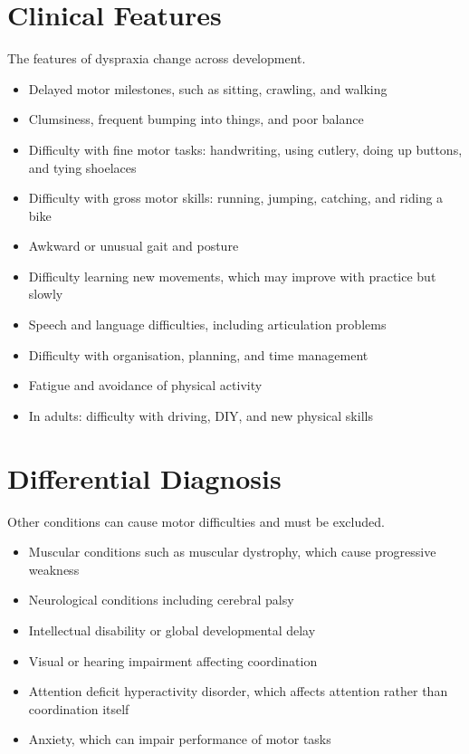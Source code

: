 \section*{Clinical Features}
The features of dyspraxia change across development.
\begin{itemize}
    \item Delayed motor milestones, such as sitting, crawling, and walking
    \item Clumsiness, frequent bumping into things, and poor balance
    \item Difficulty with fine motor tasks: handwriting, using cutlery, doing up buttons, and tying shoelaces
    \item Difficulty with gross motor skills: running, jumping, catching, and riding a bike
    \item Awkward or unusual gait and posture
    \item Difficulty learning new movements, which may improve with practice but slowly
    \item Speech and language difficulties, including articulation problems
    \item Difficulty with organisation, planning, and time management
    \item Fatigue and avoidance of physical activity
    \item In adults: difficulty with driving, DIY, and new physical skills
\end{itemize}

\section*{Differential Diagnosis}
Other conditions can cause motor difficulties and must be excluded.
\begin{itemize}
    \item Muscular conditions such as muscular dystrophy, which cause progressive weakness
    \item Neurological conditions including cerebral palsy
    \item Intellectual disability or global developmental delay
    \item Visual or hearing impairment affecting coordination
    \item Attention deficit hyperactivity disorder, which affects attention rather than coordination itself
    \item Anxiety, which can impair performance of motor tasks
\end{itemize}

